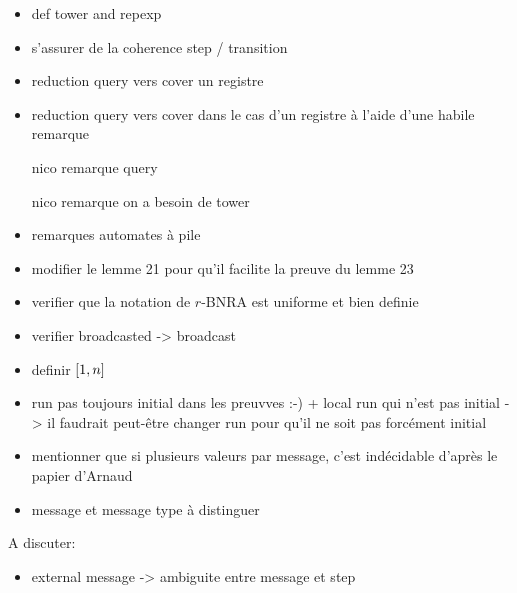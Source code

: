 \begin{itemize}
	\item def tower and repexp
	\item s'assurer de la coherence step / transition
    \item reduction query vers cover un registre
    \item reduction query vers cover dans le cas d'un registre à l'aide d'une habile remarque
    \item[nico] remarque query 
    \item[nico] remarque on a besoin de tower
    \item remarques automates à pile
    \item modifier le lemme 21 pour qu'il facilite la preuve du lemme 23
    \item verifier que la notation de $r$-BNRA est uniforme et bien definie
    \item  verifier broadcasted -> broadcast
    \item definir $[1,n]$
    \item run pas toujours initial dans les preuvves :-) + local run qui n'est pas initial -> il faudrait peut-être changer run pour qu'il ne soit pas forcément initial
    \item mentionner que si plusieurs valeurs par message, c'est indécidable d'après le papier d'Arnaud
    \item message et message type à distinguer 
\end{itemize}

A discuter:
\begin{itemize}
\item external message -> ambiguite entre message et step 
\end{itemize}